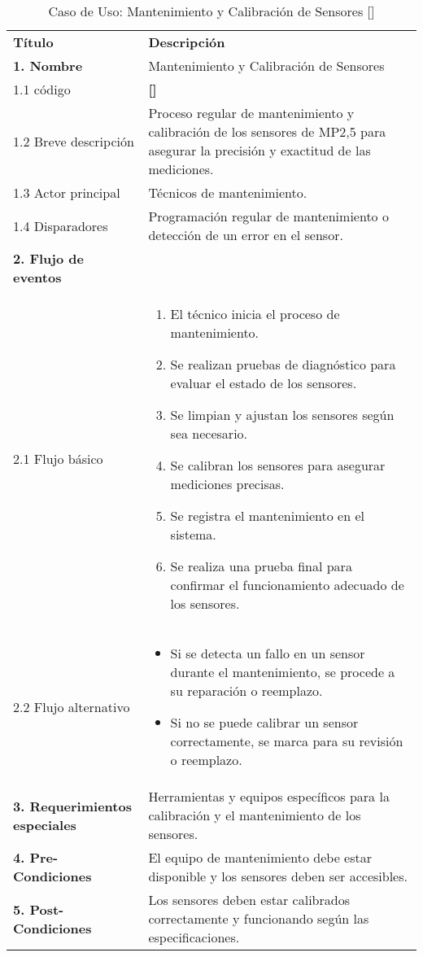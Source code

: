 \documentclass[
11pt, %
codirector, %
]{charter}
\makeatletter
\newcommand{\mytwodigits}[1]{\two@digits{#1}}
\newcounter{reqCounter}
\makeatother
\begin{document}

\begin{table}[h!]
		\caption{Caso de Uso: Mantenimiento y Calibración de Sensores [\CODrequerimiento\mytwodigits{\value{reqCounter}}]}
	\centering
	\begin{tabular}{ | m{4.0cm} | m{10cm} | }
		\hline
		\rowcolor{gray!50} %
		\textbf{Título} & \textbf{Descripción} \\ %
		\textbf{1. Nombre} & Mantenimiento y Calibración de Sensores \\
		1.1 código &\textbf{[\CODrequerimiento\mytwodigits{\value{reqCounter}}]} \\
		1.2 Breve descripción & Proceso regular de mantenimiento y calibración de los sensores de MP2,5 para asegurar la precisión y exactitud de las mediciones. \\
		1.3 Actor principal & Técnicos de mantenimiento. \\
		1.4 Disparadores & Programación regular de mantenimiento o detección de un error en el sensor. \\ \hline
		\textbf{2. Flujo de eventos} &  \\
		2.1 Flujo básico & 
		\begin{enumerate}
			\item El técnico inicia el proceso de mantenimiento.
			\item Se realizan pruebas de diagnóstico para evaluar el estado de los sensores.
			\item Se limpian y ajustan los sensores según sea necesario.
			\item Se calibran los sensores para asegurar mediciones precisas.
			\item Se registra el mantenimiento en el sistema.
			\item Se realiza una prueba final para confirmar el funcionamiento adecuado de los sensores.
		\end{enumerate} \\
		2.2 Flujo alternativo & 
		\begin{itemize}
			\item Si se detecta un fallo en un sensor durante el mantenimiento, se procede a su reparación o reemplazo.
			\item Si no se puede calibrar un sensor correctamente, se marca para su revisión o reemplazo.
		\end{itemize} \\ \hline
		\textbf{3. Requerimientos especiales} & Herramientas y equipos específicos para la calibración y el mantenimiento de los sensores. \\ \hline
		\textbf{4. Pre-Condiciones} & El equipo de mantenimiento debe estar disponible y los sensores deben ser accesibles. \\ \hline
		\textbf{5. Post-Condiciones} & Los sensores deben estar calibrados correctamente y funcionando según las especificaciones. \\ \hline
	\end{tabular}

\end{table}
\end{document}
